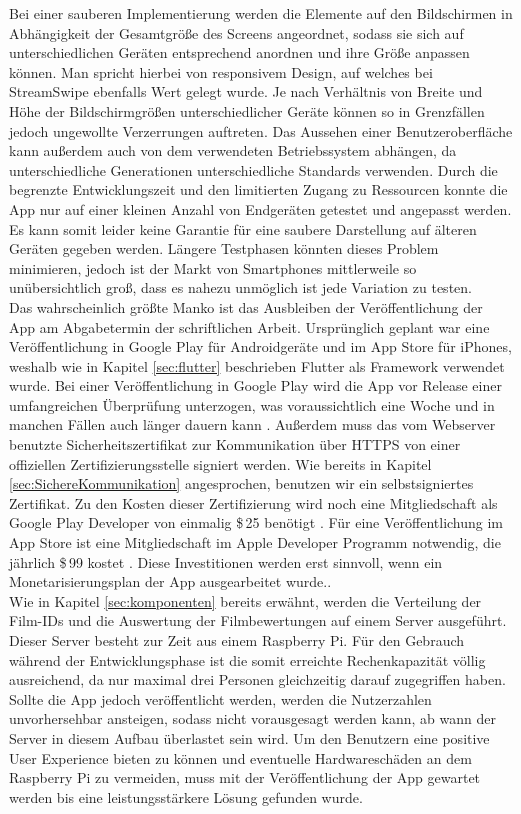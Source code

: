 \noindent
Bei einer sauberen Implementierung werden die Elemente auf den Bildschirmen in Abhängigkeit der Gesamtgröße des Screens angeordnet, sodass sie sich auf unterschiedlichen Geräten entsprechend anordnen und ihre Größe anpassen können. Man spricht hierbei von responsivem Design, auf welches bei StreamSwipe ebenfalls Wert gelegt wurde. Je nach Verhältnis von Breite und Höhe der Bildschirmgrößen unterschiedlicher Geräte können so in Grenzfällen jedoch ungewollte Verzerrungen auftreten. Das Aussehen einer Benutzeroberfläche kann außerdem auch von dem verwendeten Betriebssystem abhängen, da unterschiedliche Generationen unterschiedliche Standards verwenden. Durch die begrenzte Entwicklungszeit  und den limitierten Zugang zu Ressourcen konnte die App nur auf einer kleinen Anzahl von  Endgeräten getestet und angepasst werden. Es kann somit leider keine Garantie für eine saubere Darstellung auf älteren Geräten gegeben werden. Längere Testphasen könnten dieses Problem minimieren, jedoch ist der Markt von Smartphones mittlerweile so unübersichtlich groß, dass es nahezu unmöglich ist jede Variation zu testen.\\

\noindent
Das wahrscheinlich größte Manko ist das Ausbleiben der Veröffentlichung der App am Abgabetermin der schriftlichen Arbeit. Ursprünglich geplant war eine Veröffentlichung in Google Play für Androidgeräte und im App Store für iPhones, weshalb wie in Kapitel \ref{sec:flutter} beschrieben Flutter als Framework verwendet wurde. Bei einer Veröffentlichung in Google Play wird die App vor Release einer umfangreichen Überprüfung unterzogen, was voraussichtlich eine Woche und in manchen Fällen auch länger dauern kann \cite{playstore_release}. Außerdem muss das vom Webserver benutzte Sicherheitszertifikat zur Kommunikation über HTTPS von einer offiziellen Zertifizierungsstelle signiert werden. Wie bereits in Kapitel \ref{sec:SichereKommunikation} angesprochen, benutzen wir ein selbstsigniertes Zertifikat. Zu den Kosten dieser Zertifizierung wird noch eine Mitgliedschaft als Google Play Developer von einmalig \$\,25 benötigt \cite{kostenPlayStoreDeveloper}. Für eine  Veröffentlichung im App Store ist eine Mitgliedschaft im Apple Developer Programm notwendig, die jährlich \$\,99 kostet \cite{appstore_release}. Diese Investitionen werden erst sinnvoll, wenn ein Monetarisierungsplan der App ausgearbeitet wurde.. \\

\noindent
Wie in Kapitel \ref{sec:komponenten} bereits erwähnt, werden die Verteilung der Film-IDs und die Auswertung der Filmbewertungen auf einem Server ausgeführt. Dieser Server besteht zur Zeit aus einem Raspberry Pi. Für den Gebrauch während der Entwicklungsphase ist die somit erreichte Rechenkapazität völlig ausreichend, da nur maximal drei Personen gleichzeitig darauf zugegriffen haben. Sollte die App jedoch veröffentlicht werden, werden die Nutzerzahlen unvorhersehbar ansteigen, sodass nicht vorausgesagt werden kann, ab wann der Server in diesem Aufbau überlastet sein wird. Um den Benutzern eine positive User Experience bieten zu können und eventuelle Hardwareschäden an dem Raspberry Pi zu vermeiden, muss mit der Veröffentlichung der App gewartet werden bis eine leistungsstärkere Lösung gefunden wurde.